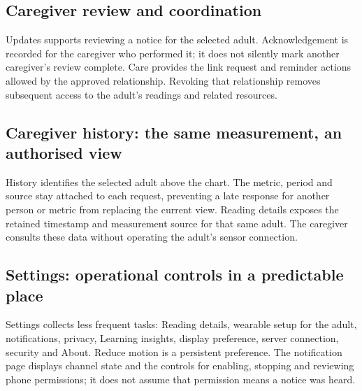 \clearpage
\subsection{Caregiver review and coordination}
Updates supports reviewing a notice for the selected adult. Acknowledgement is recorded for the caregiver who performed it; it does not silently mark another caregiver's review complete. Care provides the link request and reminder actions allowed by the approved relationship. Revoking that relationship removes subsequent access to the adult's readings and related resources.


\clearpage
\subsection{Caregiver history: the same measurement, an authorised view}
History identifies the selected adult above the chart. The metric, period and source stay attached to each request, preventing a late response for another person or metric from replacing the current view. Reading details exposes the retained timestamp and measurement source for that same adult. The caregiver consults these data without operating the adult's sensor connection.


\clearpage
\subsection{Settings: operational controls in a predictable place}
Settings collects less frequent tasks: Reading details, wearable setup for the adult, notifications, privacy, Learning insights, display preference, server connection, security and About. Reduce motion is a persistent preference. The notification page displays channel state and the controls for enabling, stopping and reviewing phone permissions; it does not assume that permission means a notice was heard.

